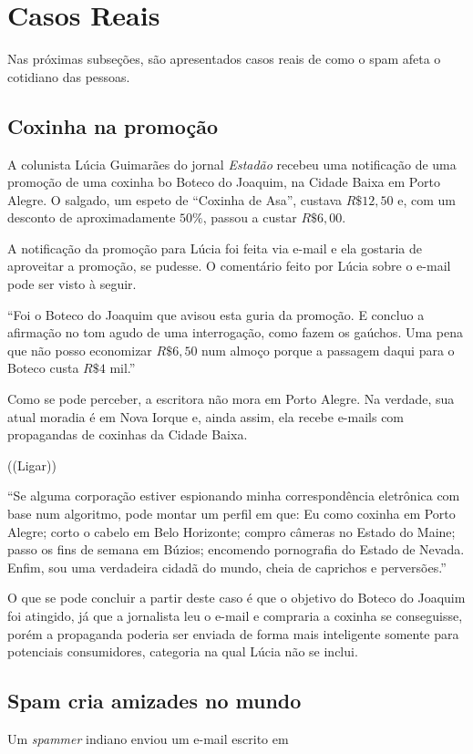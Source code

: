 \documentclass[a4paper,dvipdfm]{article}
\begin{document}
\newpage
\section{Casos Reais}
	Nas próximas subseções, são apresentados casos reais de como o spam afeta o cotidiano das pessoas.

	\subsection {Coxinha na promoção}
		A colunista Lúcia Guimarães do jornal \emph{Estadão} recebeu uma notificação de uma promoção de uma coxinha bo Boteco do Joaquim, na Cidade Baixa em Porto Alegre.
		O salgado, um espeto de ``Coxinha de Asa'', custava $R\$12,50$ e, com um desconto de aproximadamente $50\%$, passou a custar $R\$6,00$.

		A notificação da promoção para Lúcia foi feita via e-mail e ela gostaria de aproveitar a promoção, se pudesse.
		O comentário feito por Lúcia sobre o e-mail pode ser visto à seguir.

		``Foi o Boteco do Joaquim que avisou esta guria da promoção. E concluo a afirmação no tom agudo de uma interrogação, como fazem os gaúchos. Uma pena que não posso economizar $R\$ 6,50$ num almoço porque a passagem daqui para o Boteco custa $R\$ 4$ mil.''

		Como se pode perceber, a escritora não mora em Porto Alegre.
		Na verdade, sua atual moradia é em Nova Iorque e, ainda assim, ela recebe e-mails com propagandas de coxinhas da Cidade Baixa.

		((Ligar))

		``Se alguma corporação estiver espionando minha correspondência eletrônica com base num algoritmo, pode montar um perfil em que: 
		Eu como coxinha em Porto Alegre; 
		corto o cabelo em Belo Horizonte; 
		compro câmeras no Estado do Maine; 
		passo os fins de semana em Búzios; 
		encomendo pornografia do Estado de Nevada. 
		Enfim, sou uma verdadeira cidadã do mundo, cheia de caprichos e perversões.''
			
		O que se pode concluir a partir deste caso é que o objetivo do Boteco do Joaquim foi atingido, já que a jornalista leu o e-mail e compraria a coxinha se conseguisse, porém a propaganda poderia ser enviada de forma mais inteligente somente para potenciais consumidores, categoria na qual Lúcia não se inclui.

	\subsection {Spam cria amizades no mundo}
		Um \emph{spammer} indiano enviou um e-mail escrito em 
\newpage
\end{document}
